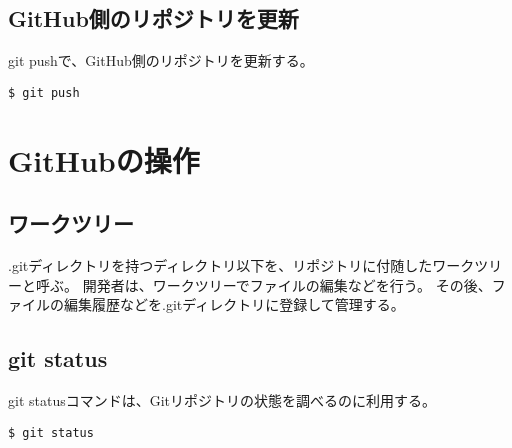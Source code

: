 \documentclass[11pt, oneside]{article}   	%
\begin{document}
\subsection{GitHub側のリポジトリを更新}
git pushで、GitHub側のリポジトリを更新する。
\begin{lstlisting}
$ git push
\end{lstlisting}


\section{GitHubの操作}
\subsection{ワークツリー}
.gitディレクトリを持つディレクトリ以下を、リポジトリに付随したワークツリーと呼ぶ。
開発者は、ワークツリーでファイルの編集などを行う。
その後、ファイルの編集履歴などを.gitディレクトリに登録して管理する。\\

\subsection{git status}
git statusコマンドは、Gitリポジトリの状態を調べるのに利用する。
\begin{lstlisting}
$ git status
\end{lstlisting}
\end{document}
